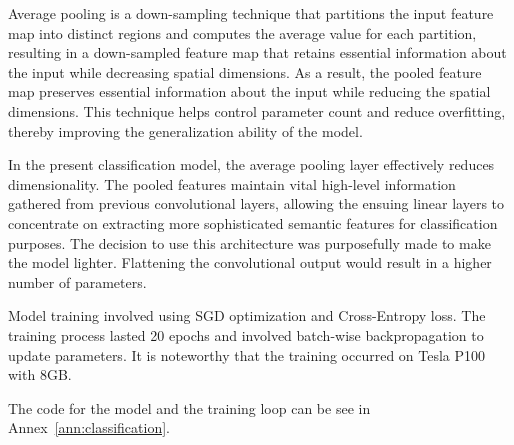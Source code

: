 Average pooling is a down-sampling technique that partitions the input feature map into distinct regions and computes the average value for each partition, resulting in a down-sampled feature map that retains essential information about the input while decreasing spatial dimensions. As a result, the pooled feature map preserves essential information about the input while reducing the spatial dimensions. This technique helps control parameter count and reduce overfitting, thereby improving the generalization ability of the model.

In the present classification model, the average pooling layer effectively reduces dimensionality. The pooled features maintain vital high-level information gathered from previous convolutional layers, allowing the ensuing linear layers to concentrate on extracting more sophisticated semantic features for classification purposes. The decision to use this architecture was purposefully made to make the model lighter. Flattening the convolutional output would result in a higher number of parameters.

Model training involved using \ac{SGD} optimization and Cross-Entropy loss. The training process lasted 20 epochs and involved batch-wise backpropagation to update parameters. It is noteworthy that the training occurred on Tesla P100 with 8GB.

The code for the model and the training loop can be see in Annex~\ref{ann:classification}.